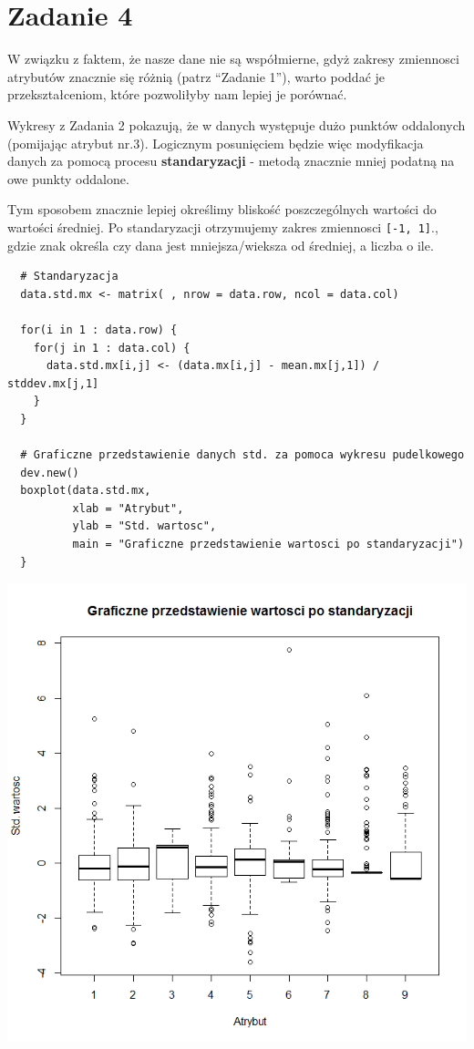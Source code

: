 \documentclass[a4paper,12pt,twoside]{article}
\begin{document}
\section{Zadanie 4}
\bigskip

W związku z faktem, że nasze dane nie są współmierne, gdyż zakresy zmiennosci atrybutów znacznie
się różnią (patrz ``Zadanie 1''), warto poddać je przekształceniom, które pozwoliłyby nam lepiej
je porównać.

Wykresy z Zadania 2 pokazują, że w danych występuje dużo punktów oddalonych (pomijając atrybut nr.3).
Logicznym posunięciem będzie więc modyfikacja danych za pomocą procesu \textbf{standaryzacji} - metodą
znacznie mniej podatną na owe punkty oddalone.

Tym sposobem znacznie lepiej określimy bliskość poszczególnych wartości do wartości średniej.
Po standaryzacji otrzymujemy zakres zmiennosci \texttt{[-1, 1]}., gdzie znak określa czy dana jest
mniejsza/wieksza od średniej, a liczba o ile.

\medskip
\begin{lstlisting}
  # Standaryzacja
  data.std.mx <- matrix( , nrow = data.row, ncol = data.col)

  for(i in 1 : data.row) {
    for(j in 1 : data.col) {
      data.std.mx[i,j] <- (data.mx[i,j] - mean.mx[j,1]) / stddev.mx[j,1]
    }
  }

  # Graficzne przedstawienie danych std. za pomoca wykresu pudelkowego
  dev.new()
  boxplot(data.std.mx,
          xlab = "Atrybut",
          ylab = "Std. wartosc",
          main = "Graficzne przedstawienie wartosci po standaryzacji")
  }
\end{lstlisting}

\begin{center}
\includegraphics[width=.90\textwidth]{img/4_standaryzacja.png}
\end{center}
\end{document}
